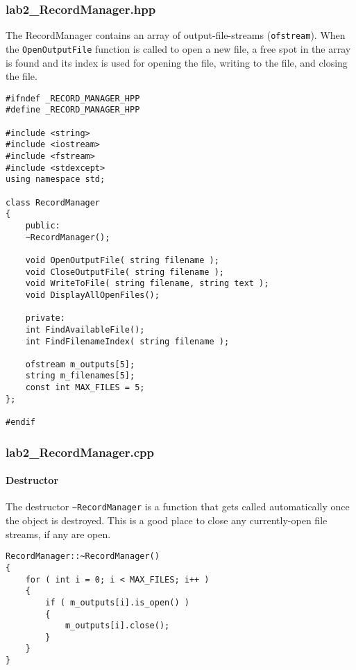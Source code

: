 \documentclass[a4paper,12pt]{book}
\begin{document}
            \subsubsection*{lab2\_RecordManager.hpp}

            The RecordManager contains an array of output-file-streams
            (\texttt{ofstream}). When the \texttt{OpenOutputFile} function
            is called to open a new file, a free spot in the array is found
            and its index is used for opening the file, writing to the
            file, and closing the file.

\begin{lstlisting}[style=code]
#ifndef _RECORD_MANAGER_HPP
#define _RECORD_MANAGER_HPP

#include <string>
#include <iostream>
#include <fstream>
#include <stdexcept>
using namespace std;

class RecordManager
{
    public:
    ~RecordManager();
    
    void OpenOutputFile( string filename );
    void CloseOutputFile( string filename );
    void WriteToFile( string filename, string text );
    void DisplayAllOpenFiles();
    
    private:
    int FindAvailableFile();
    int FindFilenameIndex( string filename );
    
    ofstream m_outputs[5];
    string m_filenames[5];
    const int MAX_FILES = 5;
};

#endif
\end{lstlisting}

            \newpage
            \subsubsection*{lab2\_RecordManager.cpp}

            \paragraph{Destructor}
            The destructor \texttt{\textasciitilde RecordManager} is
            a function that gets called automatically once the object
            is destroyed. This is a good place to close any currently-open
            file streams, if any are open.
            
\begin{lstlisting}[style=code]
RecordManager::~RecordManager()
{
    for ( int i = 0; i < MAX_FILES; i++ )
    {
        if ( m_outputs[i].is_open() )
        {
            m_outputs[i].close();
        }
    }
}
\end{lstlisting}
\end{document}
